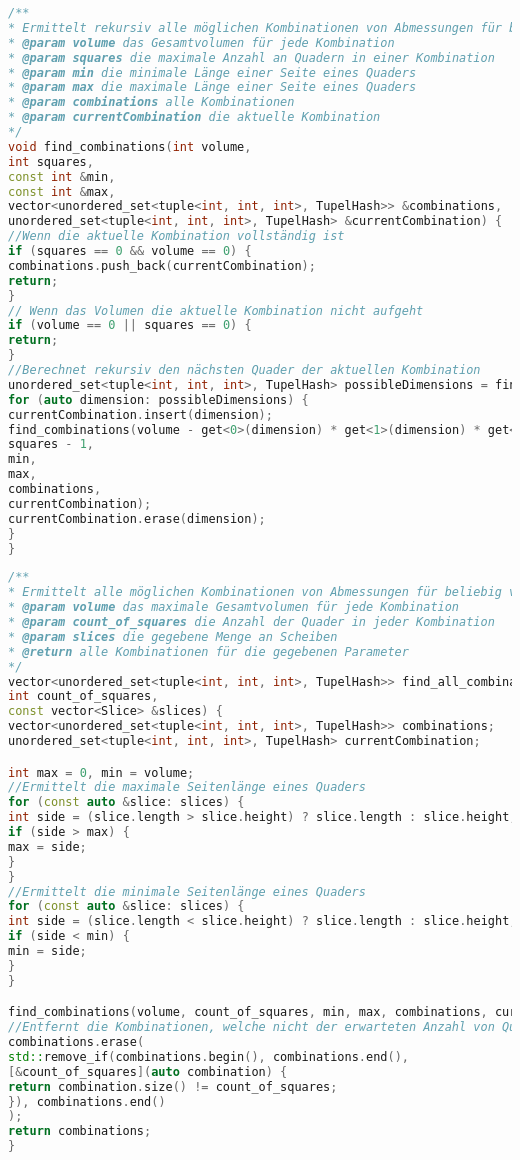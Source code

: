 \documentclass[a4paper,10pt,ngerman]{scrartcl}
\begin{document}
    \begin{lstlisting}[frame=single,language=C++,title=Methode find\_combinations,breaklines=true,label={lst:code_findCombinations}]
/**
* Ermittelt rekursiv alle möglichen Kombinationen von Abmessungen für beliebig viele Quader
* @param volume das Gesamtvolumen für jede Kombination
* @param squares die maximale Anzahl an Quadern in einer Kombination
* @param min die minimale Länge einer Seite eines Quaders
* @param max die maximale Länge einer Seite eines Quaders
* @param combinations alle Kombinationen
* @param currentCombination die aktuelle Kombination
*/
void find_combinations(int volume,
int squares,
const int &min,
const int &max,
vector<unordered_set<tuple<int, int, int>, TupelHash>> &combinations,
unordered_set<tuple<int, int, int>, TupelHash> &currentCombination) {
//Wenn die aktuelle Kombination vollständig ist
if (squares == 0 && volume == 0) {
combinations.push_back(currentCombination);
return;
}
// Wenn das Volumen die aktuelle Kombination nicht aufgeht
if (volume == 0 || squares == 0) {
return;
}
//Berechnet rekursiv den nächsten Quader der aktuellen Kombination
unordered_set<tuple<int, int, int>, TupelHash> possibleDimensions = find_dimensions(volume, min, max);
for (auto dimension: possibleDimensions) {
currentCombination.insert(dimension);
find_combinations(volume - get<0>(dimension) * get<1>(dimension) * get<2>(dimension),
squares - 1,
min,
max,
combinations,
currentCombination);
currentCombination.erase(dimension);
}
}
    \end{lstlisting}

    \begin{lstlisting}[frame=single,language=C++,title=Methode find\_all\_combinations,breaklines=true,label={lst:code_findAllCombinations}]
/**
* Ermittelt alle möglichen Kombinationen von Abmessungen für beliebig viele Quader
* @param volume das maximale Gesamtvolumen für jede Kombination
* @param count_of_squares die Anzahl der Quader in jeder Kombination
* @param slices die gegebene Menge an Scheiben
* @return alle Kombinationen für die gegebenen Parameter
*/
vector<unordered_set<tuple<int, int, int>, TupelHash>> find_all_combinations(int volume,
int count_of_squares,
const vector<Slice> &slices) {
vector<unordered_set<tuple<int, int, int>, TupelHash>> combinations;
unordered_set<tuple<int, int, int>, TupelHash> currentCombination;

int max = 0, min = volume;
//Ermittelt die maximale Seitenlänge eines Quaders
for (const auto &slice: slices) {
int side = (slice.length > slice.height) ? slice.length : slice.height;
if (side > max) {
max = side;
}
}
//Ermittelt die minimale Seitenlänge eines Quaders
for (const auto &slice: slices) {
int side = (slice.length < slice.height) ? slice.length : slice.height;
if (side < min) {
min = side;
}
}

find_combinations(volume, count_of_squares, min, max, combinations, currentCombination);
//Entfernt die Kombinationen, welche nicht der erwarteten Anzahl von Quadern entsprechen
combinations.erase(
std::remove_if(combinations.begin(), combinations.end(),
[&count_of_squares](auto combination) {
return combination.size() != count_of_squares;
}), combinations.end()
);
return combinations;
}
    \end{lstlisting}
\end{document}

